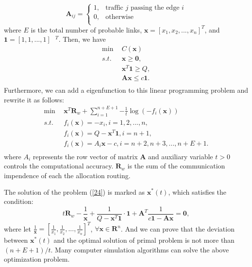 \documentclass[journal,12pt,draftclsnofoot,onecolumn]{IEEEtran}
\begin{document}
\begin{equation}\label{201}
{{\mathbf{A}}_{ij}}=\left\{ \begin{matrix}
   1, & \text{traffic }j\text{ passing the edge } i  \\
   0, & \text{otherwise}  \\
\end{matrix} \right.
\end{equation}
where $E$ is the total number of probable links, $\mathbf{x}={{[{{x}_{1}},{{x}_{2}},...,{{x}_{n}}]}^{T}}$, and $\mathbf{1}=[1,1,...,1]{{\text{ }}^{T}}$.
Then, we have
\begin{equation}\label{21}
\begin{aligned}
  \min\ \ & C(\mathbf{x}) \\
 s.t.\ \ & \mathbf{x}\ge \mathbf{0}, \\
 & {{\mathbf{x}}^{T}}\mathbf{1}\ge Q, \\
 & \mathbf{Ax}\le c\mathbf{1}. \\
\end{aligned}
\end{equation}
Furthermore, we can add a eigenfunction to this linear programming problem and rewrite it as follows:
\begin{equation}\label{24}
\begin{aligned}
\min\ \  &{{\mathbf{x}}^{T}}{{\mathbf{R}}_{w}}+\sum\limits_{i=1}^{n+E+1}{-\frac{1}{t}}\log (-f_{i}(\mathbf{x})) \\
s.t.\ \ & {{f}_{i}}(\mathbf{x})=-x_{i},i=1,2,...,n, \\
 & {{f}_{i}}(\mathbf{x})=Q-{{\mathbf{x}}^{T}}\mathbf{1},i=n+1, \\
 & {{f}_{i}}(\mathbf{x})=A_{i}\mathbf{x}-c,i=n+2,n+3,...,n+E+1. \\
\end{aligned}
\end{equation}
where $A_{i}$ represents the row vector of matrix $\mathbf{A}$ and auxiliary variable $t>0$ controls the computational accuracy. ${\mathbf{R}}_{w}$ is the sum of the communication impendence of each the allocation routing.

The solution of the problem (\ref{24}) is marked as $\mathbf{x^{\ast}}(t)$, which satisfies the condition:
\begin{equation}\label{29}
t{{\mathbf{R}}_{w}}-\frac{1}{\mathbf{x}}+\frac{1}{Q-{{\mathbf{x}}^{T}}\mathbf{1}}\cdot \mathbf{1}+{{\mathbf{A}}^{T}}\frac{1}{c\mathbf{1}-\mathbf{Ax}}=\mathbf{0},
\end{equation}
where let $\frac{1}{\mathbf{x}}\!=\!{{[\frac{1}{{{x}_{1}}},\frac{1}{{{x}_{2}}},...,\frac{1}{{{x}_{n}}}]}^{T}}$, $\forall\mathbf{x}\!\in\! {{\mathbf{R}}^{n}}$.
And we can prove that the deviation between $\mathbf{x^{\ast}}(t)$ and the optimal solution of primal problem is not more than $(n+E+1)/t$. Many computer simulation algorithms can solve the above optimization problem.
\end{document}
